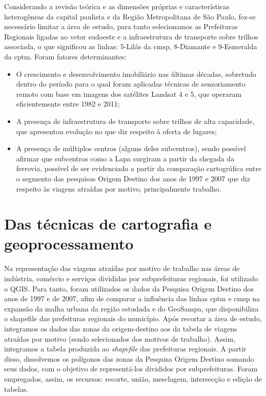 	Considerando a revisão teórica e as dimensões próprias e características heterogêneas da capital paulista e da Região Metropolitana de São Paulo, fez-se necessário limitar a área de estudo, para tanto selecionamos as Prefeituras Regionais ligadas ao vetor sudoeste e a infraestrutura de transporte sobre trilhos associada, o que significou as linhas: 5-Lilás da \gls{cmsp}, 8-Diamante e 9-Esmeralda da \gls{cptm}. Foram fatores determinantes:
	\begin{itemize}
		\item O crescimento e desenvolvimento imobiliário nas últimas décadas, sobretudo dentro do período para o qual foram aplicadas técnicas de sensoriamento remoto com base em imagens dos satélites Landsat 4 e 5, que operaram eficientemente entre 1982 e 2011;
		\item A presença de infraestrutura de transporte sobre trilhos de alta capacidade, que apresentou evolução no que diz respeito à oferta de lugares;
		\item A presença de múltiplos centros (alguns deles subcentros), sendo possível afirmar que subcentros como a Lapa surgiram a partir da chegada da ferrovia, possível de ser evidenciado a partir da comparação cartográfica entre o segmento das pesquisas Origem Destino dos anos de 1997 e 2007 que diz respeito às viagens atraídas por motivo, principalmente trabalho.
	\end{itemize}
	
	\section{Das técnicas de cartografia e geoprocessamento}
	
	Na representação das viagens atraídas por motivo de trabalho nas áreas de indústria, comércio e serviços divididas por subprefeituras regionais, foi utilizado o QGIS. Para tanto, foram utilizados os dados da Pesquisa Origem Destino dos anos de 1997 e de 2007, afim de comparar a influência das linhas \gls{cptm} e \gls{cmsp} na expansão da malha urbana da região estudada e do GeoSampa, que disponibiliza o shapefile das prefeituras regionais do município. Após recortar a área de estudo, integramos os dados das zonas da origem-destino aos da tabela de viagens atraídas por motivo (sendo selecionados dos motivos de trabalho). Assim, integramos a tabela produzida ao \textit{shapefile} das prefeituras regionais. A partir disso, dissolvemos os polígonos das zonas da Pesquisa Origem Destino somando seus dados, com o objetivo de representá-los divididos por subprefeituras. Foram empregados, assim, os recursos: recorte, união, mesclagem, intersecção e edição de tabelas.
	
